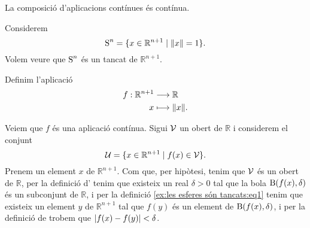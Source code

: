 \documentclass[../Apunts.tex]{subfiles}
\begin{document}
	\begin{observation}
		\label{obs:la composició d'aplicacions contínues és contínua}
		La composició d'aplicacions contínues és contínua.
	\end{observation}
	\begin{example}
		\label{ex:les esferes són tancats}
		Considerem
		\[\esfera^{n}=\{x\in\mathbb{R}^{n+1}\mid\norm{x}=1\}.\]
		Volem veure que \(\operatorname{S}^{n}\) és un tancat de \(\mathbb{R}^{n+1}\).
		\begin{solution}
			Definim l'aplicació
			\begin{align*}
				f:\mathbb{R}^{n+1}&\longrightarrow\mathbb{R} \\
				x&\longmapsto\norm{x}.
			\end{align*}
			\begin{comment}
				Veiem que \(f\) és una aplicació tancada. Sigui \(\tancat{C}\) un tancat de \(\mathbb{R}^{n+1}\) i considerem el conjunt
				\[\tancat{K}=\{f(x)\in\mathbb{R}\mid x\in\tancat{C}\}.\]
				Tenim que \(\tancat{K}\) és un tancat de \(\mathbb{R}\), ja que si \(y\) és un element de \(\tancat{K}\), aleshores \(y\neq f(x)\) per a tot \(x\) de \(\obert{C}\), i per tant existeix un real \(d>0\) tal que
				\[d=\min_{x\in\tancat{C}}\abs{f(x)-y},\]
				i per tant tenim que per a tot \(y\) de \(\mathbb{R}\setminus\tancat{K}\) existeix una bola \(\bola(y,d)\) tal que \(\bola(y,d)\cap\tancat{K}=\emptyset\), i per la definició d'\myref{def:obert espai mètric} trobem que \(\mathbb{R}\setminus\tancat{K}\) és un obert de \(\mathbb{R}\). Aleshores per la definició de \myref{def:tancat} trobem que \(\tancat{K}\) és un tancat, i per la definició d'\myref{def:aplicació tancada} trobem que \(f\) és una aplicació tancada.
				
				Ara bé, tenim que \(\{1\}\) és un tancat de \(\mathbb{R}\)
			\end{comment}
			Veiem que \(f\) és una aplicació contínua. Sigui \(\mathcal{V}\) un obert de \(\mathbb{R}\) i considerem el conjunt
			\begin{equation}
				\label{ex:les esferes són tancats:eq1}
				\mathcal{U}=\{x\in\mathbb{R}^{n+1}\mid f(x)\in\mathcal{V}\}.
			\end{equation}
			Prenem un element \(x\) de \(\mathbb{R}^{n+1}\). Com que, per hipòtesi, tenim que \(\mathcal{V}\) és un obert de \(\mathbb{R}\), per la definició d' tenim que existeix un real \(\delta>0\) tal que la bola \(\operatorname{B}(f(x),\delta)\) és un subconjunt de \(\mathbb{R}\), i per la definició \eqref{ex:les esferes són tancats:eq1} tenim que existeix un element \(y\) de \(\mathbb{R}^{n+1}\) tal que \(f(y)\) és un element de \(\operatorname{B}(f(x),\delta)\), i per la definició de  trobem que \(\abs{f(x)-f(y)}<\delta\).
		\end{solution}
	\end{example}
\end{document}
